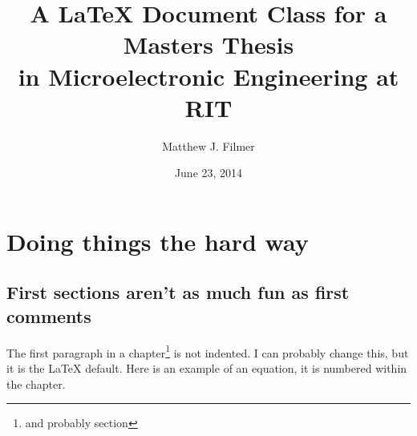 \documentclass{ritthesis}
\author{Matthew J. Filmer}
\title{A \LaTeX{} Document Class for a Masters Thesis\\in Microelectronic Engineering at RIT}
\date{June 23, 2014}
\begin{document}
\makefrontmatter


\begin{acknowledgments}
\lipsum[4-6]
\end{acknowledgments}

\begin{abstract}
\lipsum[1-2] 
\end{abstract}

\makealllists

\mainmatter



\chapter{Doing things the hard way}

\section{First sections aren't as much fun as first comments}
The first paragraph in a chapter\footnote{and probably section} is not indented. I can probably change this, but it is the \LaTeX{} default. Here is an example of an equation, it is numbered within the chapter. 
\end{document}
